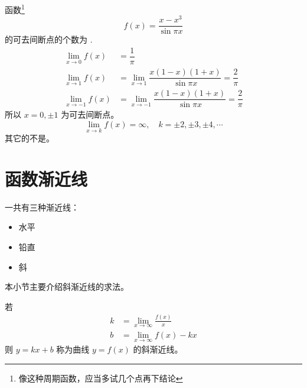 \begin{example}
    函数\footnote{像这种周期函数，应当多试几个点再下结论}
    \[
        f(x) = \dfrac{x - x^3}{\sin \pi x}
    \]
    的可去间断点的个数为
    \cite[page 62, question (2009)]{yc}.
    \begin{align*}
        \lim_{x \to 0}  f(x) &= \dfrac{1}{\pi}\\
        \lim_{x \to 1}  f(x) &= \lim_{x \to  1} \dfrac{x(1-x)(1+x)}{\sin \pi x} = \dfrac{2}{\pi}\\
        \lim_{x \to -1} f(x) &= \lim_{x \to -1} \dfrac{x(1-x)(1+x)}{\sin \pi x} = \dfrac{2}{\pi}
    \end{align*}
    所以 $x = 0, \pm 1$ 为可去间断点。
    \[
        \lim_{x \to k} f(x) = \infty, \quad k = \pm 2, \pm 3, \pm 4, \cdots
    \]
    其它的不是。
\end{example}

\section{函数渐近线}

一共有三种渐近线：
\begin{itemize}
    \item 水平
    \item 铅直
    \item 斜
\end{itemize}
本小节主要介绍斜渐近线的求法。

\begin{definition}
    若 
    \begin{align*}
        k &= \lim_{x \to \infty} \frac{f(x)}{x} \\
        b &= \lim_{x \to \infty} f(x) - kx
    \end{align*}
    则 $y = kx + b$ 称为曲线 $y = f(x)$ 的斜渐近线。
\end{definition}

